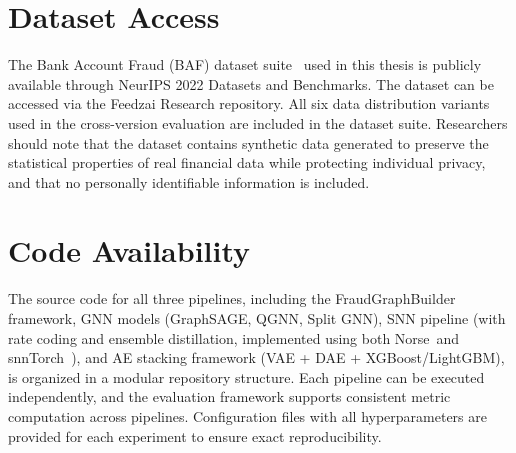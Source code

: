 \section{Dataset Access}

The Bank Account Fraud (BAF) dataset suite~\cite{jesus2022bank, feedzai2022baf} used in this thesis is publicly available through NeurIPS 2022 Datasets and Benchmarks. The dataset can be accessed via the Feedzai Research repository. All six data distribution variants used in the cross-version evaluation are included in the dataset suite. Researchers should note that the dataset contains synthetic data generated to preserve the statistical properties of real financial data while protecting individual privacy, and that no personally identifiable information is included.

\section{Code Availability}

The source code for all three pipelines, including the FraudGraphBuilder framework, GNN models (GraphSAGE, QGNN, Split GNN), SNN pipeline (with rate coding and ensemble distillation, implemented using both Norse~and snnTorch~\cite{eshraghian2021snntorch}), and AE stacking framework (VAE + DAE + XGBoost/LightGBM), is organized in a modular repository structure. Each pipeline can be executed independently, and the evaluation framework supports consistent metric computation across pipelines. Configuration files with all hyperparameters are provided for each experiment to ensure exact reproducibility.
